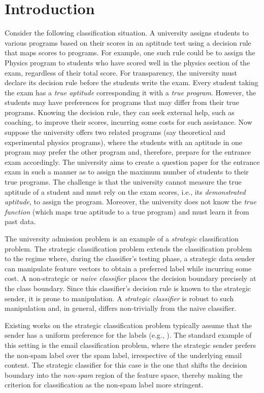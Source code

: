 \section{Introduction}
\label{sec:Introduction}
Consider the following classification situation. A university assigns students to various programs based on their scores in an aptitude test using a decision rule that maps scores to programs. For example, one such rule could be to assign the Physics program to students who have scored well in the physics section of the exam, regardless of their total score. For transparency, the university must declare its decision rule before the students write the exam. Every student taking the exam has a \textit{true aptitude} corresponding it with a \textit{true program}.
However, the students may have preferences for programs that may differ from their true programs. Knowing the decision rule, they can seek external help, such as coaching, to improve their scores, incurring some costs for such assistance. 
Now suppose the university offers two related programs (say theoretical and experimental physics programs), where the students with an aptitude in one program may prefer the other program and, therefore, prepare for the entrance exam accordingly. The university aims to create a question paper for the entrance exam  in such a manner as to assign the maximum number of students to their true programs. The challenge is that the university cannot measure the true aptitude of a student and must rely on the exam scores, i.e., its \textit{demonstrated aptitude}, to assign the program. Moreover, the university does not know the \textit{true function} (which maps true aptitude to a true program) and must learn it from past data.

The university admission problem is an example of a \textit{strategic} classification problem. The strategic classification problem extends the classification problem to the regime where, during the classifier's testing phase, a strategic data sender can manipulate feature vectors to obtain a preferred label while incurring some cost. A non-strategic or \textit{naive classifier} places the decision boundary precisely at the class boundary. Since this classifier's decision rule is known to the strategic sender, it is prone to manipulation. A \textit{strategic classifier} is robust to such manipulation and, in general, differs non-trivially from the naive classifier.

Existing works on the strategic classification problem typically assume that the sender has a uniform preference for the labels (e.g., \cite{hardt2016strategic}). The standard example of this setting is the email classification problem, where the strategic sender prefers the non-spam label over the spam label, irrespective of the underlying email content. The strategic classifier for this case is the one that shifts the decision boundary into the \textit{non-spam} region of the feature space, thereby making the criterion for classification as the non-spam label more stringent.

